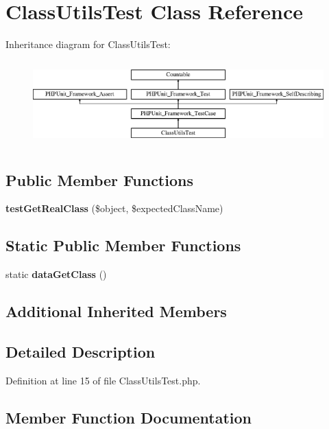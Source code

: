 \section{Class\+Utils\+Test Class Reference}
\label{class_symfony_1_1_component_1_1_security_1_1_core_1_1_tests_1_1_util_1_1_class_utils_test}
Inheritance diagram for Class\+Utils\+Test\+:\begin{figure}[H]
\begin{center}
\leavevmode
\includegraphics[height=3.303835cm]{class_symfony_1_1_component_1_1_security_1_1_core_1_1_tests_1_1_util_1_1_class_utils_test}
\end{center}
\end{figure}
\subsection*{Public Member Functions}
\begin{DoxyCompactItemize}
\item 
{\bf test\+Get\+Real\+Class} (\$object, \$expected\+Class\+Name)
\end{DoxyCompactItemize}
\subsection*{Static Public Member Functions}
\begin{DoxyCompactItemize}
\item 
static {\bf data\+Get\+Class} ()
\end{DoxyCompactItemize}
\subsection*{Additional Inherited Members}


\subsection{Detailed Description}


Definition at line 15 of file Class\+Utils\+Test.\+php.



\subsection{Member Function Documentation}
